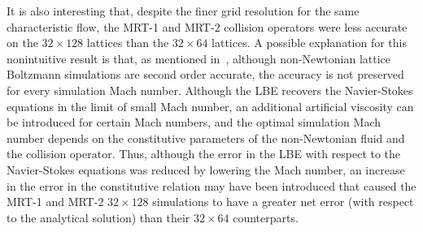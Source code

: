 It is also interesting that, despite the finer grid resolution for the same characteristic flow, the MRT-1 and MRT-2 collision operators were less accurate on the $32 \times 128$ lattices than the $32 \times 64$ lattices.
A possible explanation for this nonintuitive result is that, as mentioned in~\cite{conrad2015accuracy}, although non-Newtonian lattice Boltzmann simulations are second order accurate, the accuracy is not preserved for every simulation Mach number.
Although the LBE recovers the Navier-Stokes equations in the limit of small Mach number, an additional artificial viscosity can be introduced for certain Mach numbers, and the optimal simulation Mach number depends on the constitutive parameters of the non-Newtonian fluid and the collision operator.
Thus, although the error in the LBE with respect to the Navier-Stokes equations was reduced by lowering the Mach number, an increase in the error in the constitutive relation may have been introduced that caused the MRT-1 and MRT-2 $32 \times 128$ simulations to have a greater net error (with respect to the analytical solution) than their $32 \times 64$ counterparts.

